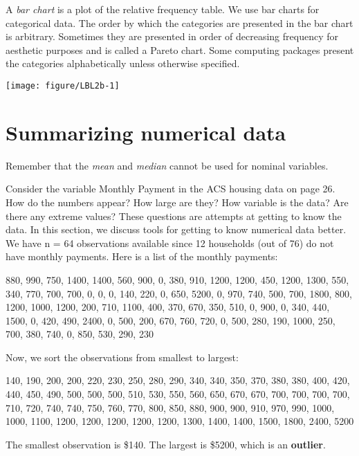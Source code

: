 \documentclass[11pt]{book}\usepackage[]{graphicx}\usepackage[]{color}
\begin{document}
A \textit{bar chart} is a plot of the relative frequency table.  We use bar charts for categorical data. The order by which the categories are presented in the bar chart is arbitrary. Sometimes they are presented in order of decreasing frequency for aesthetic purposes and is called a Pareto chart.  Some computing packages present the categories alphabetically unless otherwise specified.



{\centering \texttt{[image: figure/LBL2b-1]} 

}





\section{Summarizing numerical data}

Remember that the	\textit{mean} and \textit{median} cannot be used for nominal variables.

Consider the variable Monthly Payment in the ACS housing data on page 26.  How do the numbers appear?  How large are they? How variable is the data?  Are there any extreme values? These questions are attempts at getting to know the data.  In this section, we discuss tools for getting to know numerical data better.  We have n = 64 observations available since 12 households (out of 76) do not have monthly payments.  Here is a list of the monthly payments:

{\small{
880, 990, 750, 1400, 1400, 560, 900, 0, 380, 910, 1200, 1200, 450, 1200, 1300, 550, 340, 770, 700, 700, 0, 0, 0, 140, 220, 0, 650, 5200, 0, 970, 740, 500, 700, 1800, 800, 1200, 1000, 1200, 200, 710, 1100, 400, 370, 670, 350, 510, 0, 900, 0, 340, 440, 1500, 0, 420, 490, 2400, 0, 500, 200, 670, 760, 720, 0, 500, 280, 190, 1000, 250, 700, 380, 740, 0, 850, 530, 290, 230
}}

Now, we sort the observations from smallest to largest:

{\small{
140, 190, 200, 200, 220, 230, 250, 280, 290, 340, 340, 350, 370, 380, 380, 400, 420, 440, 450, 490, 500, 500, 500, 510, 530, 550, 560, 650, 670, 670, 700, 700, 700, 700, 710, 720, 740, 740, 750, 760, 770, 800, 850, 880, 900, 900, 910, 970, 990, 1000, 1000, 1100, 1200, 1200, 1200, 1200, 1200, 1300, 1400, 1400, 1500, 1800, 2400, 5200
}}

The smallest observation is \$140.  The largest is \$5200, which is an \textbf{outlier}.
\end{document}
